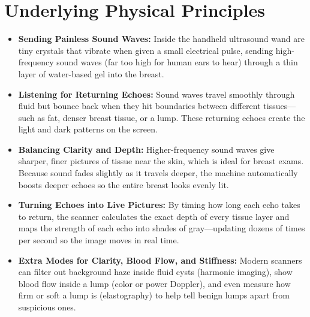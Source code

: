\section{Underlying Physical Principles}
\begin{itemize}
\item \textbf{Sending Painless Sound Waves:} Inside the handheld ultrasound wand are tiny crystals that vibrate when given a small electrical pulse, sending high-frequency sound waves (far too high for human ears to hear) through a thin layer of water-based gel into the breast.
\item \textbf{Listening for Returning Echoes:} Sound waves travel smoothly through fluid but bounce back when they hit boundaries between different tissues---such as fat, denser breast tissue, or a lump. These returning echoes create the light and dark patterns on the screen.
\item \textbf{Balancing Clarity and Depth:} Higher-frequency sound waves give sharper, finer pictures of tissue near the skin, which is ideal for breast exams. Because sound fades slightly as it travels deeper, the machine automatically boosts deeper echoes so the entire breast looks evenly lit.
\item \textbf{Turning Echoes into Live Pictures:} By timing how long each echo takes to return, the scanner calculates the exact depth of every tissue layer and maps the strength of each echo into shades of gray---updating dozens of times per second so the image moves in real time.
\item \textbf{Extra Modes for Clarity, Blood Flow, and Stiffness:} Modern scanners can filter out background haze inside fluid cysts (harmonic imaging), show blood flow inside a lump (color or power Doppler), and even measure how firm or soft a lump is (elastography) to help tell benign lumps apart from suspicious ones.
\end{itemize}

